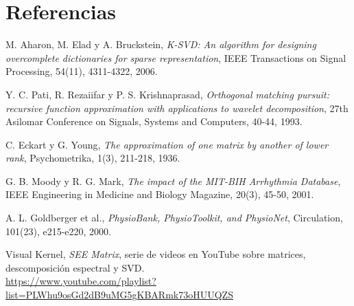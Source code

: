 \documentclass[11pt,letterpaper]{article}
\begin{document}
\section*{Referencias}

\begin{enumerate}[label={[\arabic*]}, itemsep=0.1em, leftmargin=*]
  \small
  \item M. Aharon, M. Elad y A. Bruckstein, \emph{K-SVD: An algorithm
        for designing overcomplete dictionaries for sparse
        representation}, IEEE Transactions on Signal Processing,
        54(11), 4311-4322, 2006.
  \item Y. C. Pati, R. Rezaiifar y P. S. Krishnaprasad,
        \emph{Orthogonal matching pursuit: recursive function
        approximation with applications to wavelet decomposition},
        27th Asilomar Conference on Signals, Systems and Computers,
        40-44, 1993.
  \item C. Eckart y G. Young, \emph{The approximation of one matrix by
        another of lower rank}, Psychometrika, 1(3), 211-218, 1936.
  \item G. B. Moody y R. G. Mark, \emph{The impact of the MIT-BIH
        Arrhythmia Database}, IEEE Engineering in Medicine and Biology
        Magazine, 20(3), 45-50, 2001.
  \item A. L. Goldberger et al., \emph{PhysioBank, PhysioToolkit, and
        PhysioNet}, Circulation, 101(23), e215-e220, 2000.
  \item Visual Kernel, \emph{SEE Matrix}, serie de videos en YouTube
        sobre matrices, descomposición espectral y SVD.\\
  \url{https://www.youtube.com/playlist?list=PLWhu9osGd2dB9uMG5gKBARmk73oHUUQZS}
\end{enumerate}
\end{document}
